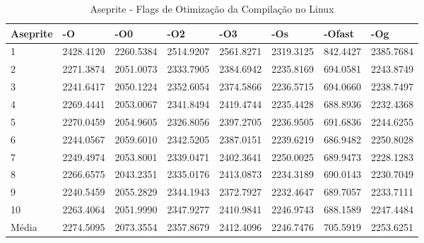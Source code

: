 \begin{table}[!ht]
\centering
\caption{Aseprite - Flags de Otimização da Compilação no Linux}
\label{tab:otimizacao_compilacao:linux:aseprite}
\begin{tabular}{llllllll}
\textbf{Aseprite} & \textbf{-O}  & \textbf{-O0}   & \textbf{-O2} & \textbf{-O3} & \textbf{-Os} & \textbf{-Ofast} & \textbf{-Og} \\ \toprule
1                 & 2428.4120    & 2260.5384      & 2514.9207    & 2561.8271    & 2319.3125    &    842.4427     & 2385.7684  \\ 
2                 & 2271.3874    & 2051.0073      & 2333.7905    & 2384.6942    & 2235.8169    &    694.0581     & 2243.8749  \\ 
3                 & 2241.6417    & 2050.1224      & 2352.6054    & 2374.5866    & 2236.5715    &    694.0660     & 2238.7497  \\ 
4                 & 2269.4441    & 2053.0067      & 2341.8494    & 2419.4744    & 2235.4428    &    688.8936     & 2232.4368  \\ 
5                 & 2270.0459    & 2054.9605      & 2326.8056    & 2397.2705    & 2236.9505    &    691.6836     & 2244.6255  \\ 
6                 & 2244.0567    & 2059.6010      & 2342.5205    & 2387.0151    & 2239.6219    &    686.9482     & 2250.8028  \\ 
7                 & 2249.4974    & 2053.8001      & 2339.0471    & 2402.3641    & 2250.0025    &    689.9473     & 2228.1283  \\ 
8                 & 2266.6575    & 2043.2351      & 2335.0176    & 2413.0873    & 2234.3189    &    690.0143     & 2230.7049  \\ 
9                 & 2240.5459    & 2055.2829      & 2344.1943    & 2372.7927    & 2232.4647    &    689.7057     & 2233.7111  \\ 
10                & 2263.4064    & 2051.9990      & 2347.9277    & 2410.9841    & 2246.9743    &    688.1589     & 2247.4484  \\ \bottomrule
Média             & 2274.5095    & 2073.3554      & 2357.8679    & 2412.4096    & 2246.7476    &    705.5919     & 2253.6251  \\ 
\end{tabular}
\end{table}

